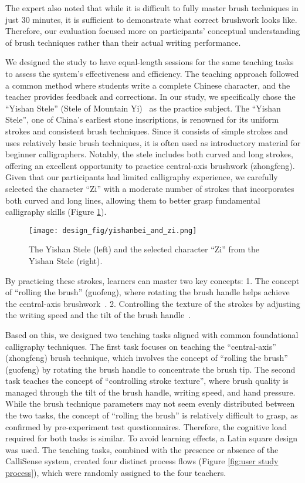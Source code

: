 The expert also noted that while it is difficult to fully master brush techniques in just 30 minutes, it is sufficient to demonstrate what correct brushwork looks like. Therefore, our evaluation focused more on participants' conceptual understanding of brush techniques rather than their actual writing performance.

We designed the study to have equal-length sessions for the same teaching tasks to assess the system's effectiveness and efficiency. The teaching approach followed a common method where students write a complete Chinese character, and the teacher provides feedback and corrections. In our study, we specifically chose the ``Yishan Stele'' (Stele of Mountain Yi)~\cite{metmuseum_yishan_stele} as the practice subject. The ``Yishan Stele'', one of China's earliest stone inscriptions, is renowned for its uniform strokes and consistent brush techniques. Since it consists of simple strokes and uses relatively basic brush techniques, it is often used as introductory material for beginner calligraphers. Notably, the stele includes both curved and long strokes, offering an excellent opportunity to practice central-axis brushwork (zhongfeng). Given that our participants had limited calligraphy experience, we carefully selected the character ``Zi'' with a moderate number of strokes that incorporates both curved and long lines, allowing them to better grasp fundamental calligraphy skills (Figure \ref{fig:Yishan Stele}).

\begin{figure}[h]
    \centering
    \texttt{[image: design\_fig/yishanbei\_and\_zi.png]}
    \caption{The Yishan Stele (left) and the selected character ``Zi'' from the Yishan Stele (right).}
    \label{fig:Yishan Stele}
\end{figure}

By practicing these strokes, learners can master two key concepts: 
1. The concept of ``rolling the brush'' (guofeng), where rotating the brush handle helps achieve the central-axis brushwork~\cite{wang2024formation}. 
2. Controlling the texture of the strokes by adjusting the writing speed and the tilt of the brush handle~\cite{qian2007towards, long2001art}.

Based on this, we designed two teaching tasks aligned with common foundational calligraphy techniques. The first task focuses on teaching the ``central-axis'' (zhongfeng) brush technique, which involves the concept of ``rolling the brush'' (guofeng) by rotating the brush handle to concentrate the brush tip. The second task teaches the concept of ``controlling stroke texture'', where brush quality is managed through the tilt of the brush handle, writing speed, and hand pressure. While the brush technique parameters may not seem evenly distributed between the two tasks, the concept of ``rolling the brush'' is relatively difficult to grasp, as confirmed by pre-experiment test questionnaires. Therefore, the cognitive load required for both tasks is similar. To avoid learning effects, a Latin square design was used. The teaching tasks, combined with the presence or absence of the CalliSense system, created four distinct process flows (Figure \ref{fig:user study process}), which were randomly assigned to the four teachers.

